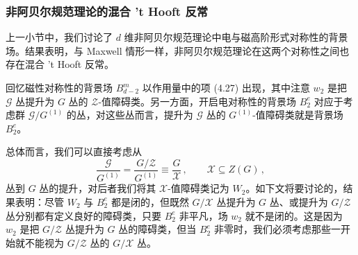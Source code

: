\subsubsection{非阿贝尔规范理论的混合 't Hooft 反常}

上一小节中，我们讨论了 $d$ 维非阿贝尔规范理论中电与磁高阶形式对称性的背景场。结果表明，与 Maxwell 情形一样，非阿贝尔规范理论在这两个对称性之间也存在混合 't Hooft 反常。

回忆磁性对称性的背景场 $B^m_{d-2}$ 以作用量中的项 (4.27) 出现，其中注意 $w_2$ 是把 $\mathcal{G}$ 丛提升为 $G$ 丛的 $\mathcal{Z}$-值障碍类。另一方面，开启电对称性的背景场 $B_2^e$ 对应于考虑群 $\mathcal{G}/G^{(1)}$ 的丛，对这些丛而言，提升为 $\mathcal{G}$ 丛的 $G^{(1)}$-值障碍类就是背景场 $B_2^e$。

总体而言，我们可以直接考虑从
\begin{equation}
\frac{\mathcal{G}}{G^{(1)}}=\frac{G/\mathcal{Z}}{G^{(1)}}\equiv\frac{G}{\mathcal{X}}\,,\qquad \mathcal{X}\subseteq Z(G)\,,
\tag{4.96}
\end{equation}
丛到 $G$ 丛的提升，对后者我们将其 $\mathcal{X}$-值障碍类记为 $W_2$。如下文将要讨论的，结果表明：尽管 $W_2$ 与 $B_2^e$ 都是闭的，但既然 $G/\mathcal{X}$ 丛提升为 $G$ 丛、或提升为 $G/\mathcal{Z}$ 丛分别都有定义良好的障碍类，只要 $B_2^e$ 非平凡，场 $w_2$ 就不是闭的。这是因为 $w_2$ 是把 $G/\mathcal{Z}$ 丛提升为 $G$ 丛的障碍类，但当 $B_2^e$ 非零时，我们必须考虑那些一开始就不能视为 $G/\mathcal{Z}$ 丛的 $G/\mathcal{X}$ 丛。


